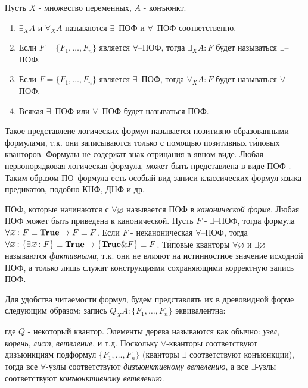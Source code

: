 \documentclass[a4paper]{jctart15b}
\begin{document}
\begin{definition}
\label{def:pcf}
Пусть $X$ - множество переменных, $A$ - конъюнкт.
\begin{enumerate}

\item $\exists_XA$ и $\forall_XA$ называются $\exists$--ПОФ и $\forall$--ПОФ соответственно.

\item Если $F = \{F_1,\ldots,F_n\}$ является $\forall$--ПОФ, тогда $\exists_XA\colon F$ будет называться $\exists$--ПОФ.

\item Если $F = \{F_1,\ldots,F_n\}$ является $\exists$--ПОФ, тогда $\forall_XA\colon F$ будет называться $\forall$--ПОФ.

\item Всякая $\exists$--ПОФ или $\forall$--ПОФ будет называться ПОФ.
\end{enumerate}
\end{definition}

Такое представлеие логических формул называется позитивно-образованными формулами, т.к. они записываются только с помощью позитивных т\'иповых кванторов. Формулы не содержат знак отрицания в явном виде. Любая первопорядковая логическая формула, может быть представлена в виде ПОФ \cite{ICDS2000}. Таким образом ПО--формула есть особый вид записи классических формул языка предикатов, подобно КНФ, ДНФ и др.

ПОФ, которые начинаются с $\forall \varnothing$ называется ПОФ в {\em канонической форме}. Любая ПОФ может быть приведена к канонической. Пусть $F$ - $\exists$--ПОФ, тогда формула $\forall \varnothing\colon F \equiv \text{\textbf{True}} \rightarrow F \equiv F$. Если $F$ - неканоническая $\forall$--ПОФ, тогда $\forall \varnothing\colon\{\exists \varnothing\colon F\} \equiv \text{\textbf{True}} \rightarrow \{\text{\textbf{True}}\&F\} \equiv F$. Т\'иповые кванторы $\forall \varnothing$ и $\exists \varnothing$ называются {\em фиктивными}, т.к. они не влияют на истинностное значение исходной ПОФ, а только лишь служат конструкциями сохраняющими корректную запись ПОФ.

Для удобства читаемости формул, будем представлять их в древовидной форме следующим образом: запись $Q_XA\colon\{F_1,\ldots,F_n\}$ эквивалентна:
\begin{center}
\end{center}
\noindent где $Q$ - некоторый квантор. Элементы дерева называются как обычно: \emph{узел}, \emph{корень}, \emph{лист}, \emph{ветвление}, и т.д. Поскольку $\forall$-кванторы соответствуют дизъюнкциям подформул $\{F_1,\ldots,F_n\}$ (кванторы $\exists$ соответствуют конъюнкции), тогда все $\forall$-узлы соответствуют {\em дизъюнктивному ветвлению}, а все $\exists$-узлы соответствуют {\em конъюнктивному ветвлению}.
\end{document}
